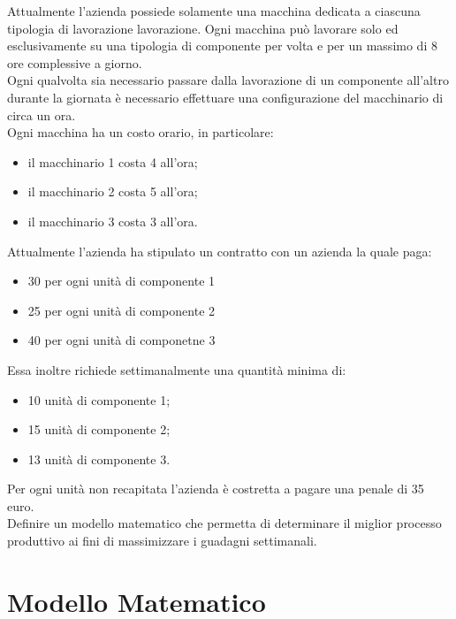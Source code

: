 \documentclass[12pt]{article}
\begin{document}
	Attualmente l'azienda possiede solamente una macchina dedicata a ciascuna tipologia di lavorazione lavorazione. Ogni macchina può lavorare solo ed esclusivamente su una tipologia di componente per volta e per un massimo di 8 ore complessive a giorno.\\
	Ogni qualvolta sia necessario passare dalla lavorazione di un componente all'altro durante la giornata è necessario effettuare una configurazione del macchinario di circa un ora.\\
	Ogni macchina ha un costo orario, in particolare:
	\begin{itemize}
		\item il macchinario 1 costa 4 all'ora;
		\item il macchinario 2 costa 5 all'ora;
		\item il macchinario 3 costa 3 all'ora.
	\end{itemize}
	Attualmente l'azienda ha stipulato un contratto con un azienda la quale paga:
	\begin{itemize}
		\item 30 per ogni unità di componente 1
		\item 25 per ogni unità di componente 2
		\item 40 per ogni unità di componetne 3
	\end{itemize}
	Essa inoltre richiede settimanalmente una quantità minima di:
	\begin{itemize}
		\item 10 unità di componente 1;
		\item 15 unità di componente 2;
		\item 13 unità di componente 3.
	\end{itemize}
	Per ogni unità non recapitata l'azienda è costretta a pagare una penale di 35 euro.\\
	Definire un modello matematico che permetta di determinare il miglior processo produttivo ai fini di massimizzare i guadagni settimanali.
	\pagebreak
	\section{Modello Matematico}
\end{document}

